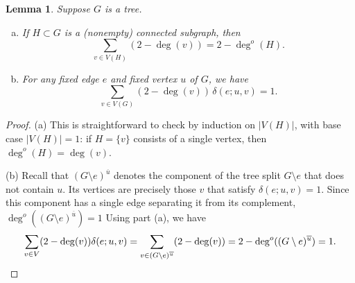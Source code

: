 \documentclass{amsart}
\newtheorem{lem}[thm]{Lemma}
\theoremstyle{definition}
\newcommand{\degout}{\deg^o}
\begin{document}
\begin{lem}
\label{lem:outdeg-sum}
Suppose $G$ is a tree.
\begin{enumerate}[(a)]
\item 
If $H\subset G$ is a (nonempty) connected subgraph, then
\[
  \sum_{v \in V(H)} \left( 2 -  \deg(v) \right) = 2 - \degout(H) .
\]

\item 
For any fixed edge $e$ and fixed vertex $u$ of $G$, we have
\[
	\sum_{v \in V(G)} (2 - \deg(v))\, \delta(e; u,v) = 1.
\]

\end{enumerate}
\end{lem}
\begin{proof}
(a)
This is straightforward to check by induction on $|V(H)|$,
with base case $|V(H)| = 1$:
if $H = \{v\}$ consists of a single vertex, then $\degout(H) = \deg(v)$.
%

(b)
Recall that $(G \setminus e)^{\overline u}$ denotes the component of the tree split $G \setminus e$ that does not contain $u$.
Its vertices are precisely those $v$ that satisfy $\delta(e; u, v) = 1$.
Since this component has a single edge separating it from its complement, 
$\degout((G \setminus e)^{\overline u}) = 1$
Using part (a), we have
\[
	\sum_{v \in V} (2 - \deg(v)) \delta(e; u,v)
	= \sum_{v \in (G \setminus e)^{\overline u}} (2 - \deg(v))
	= 2 - \degout((G \setminus e)^{\overline u}) = 1. 
	\qedhere
\] 
\end{proof}

\end{document}
